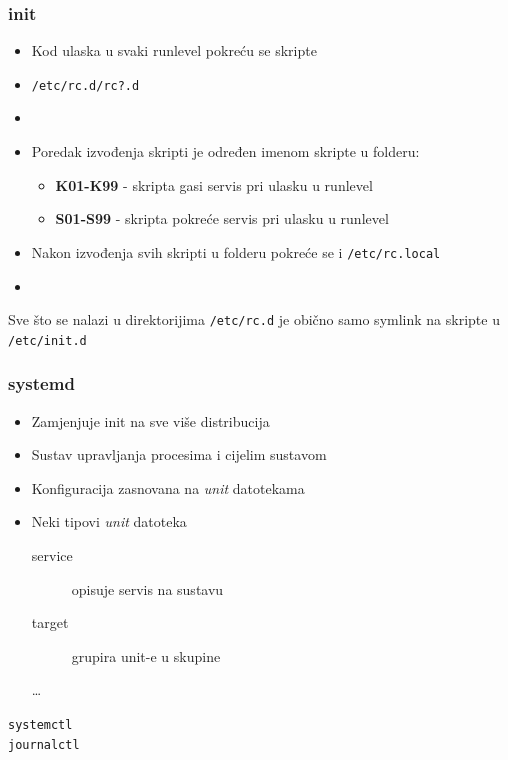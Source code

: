 \documentclass[t]{beamer}
\begin{document}
\begin{frame}
	\frametitle{init}
	\begin{itemize}
		\item Kod ulaska u svaki runlevel pokreću se skripte
		\item[] \texttt{/etc/rc.d/rc?.d}
		\item[]
		\item Poredak izvođenja skripti je određen imenom skripte u folderu:
		\begin{itemize}
			\item[] \textbf{K01-K99} - skripta gasi servis pri ulasku u runlevel
			\item[] \textbf{S01-S99} - skripta pokreće servis pri ulasku u runlevel
		\end{itemize}
		\item Nakon izvođenja svih skripti u folderu pokreće se i \texttt{/etc/rc.local}
		\item[]
	\end{itemize}
	Sve što se nalazi u direktorijima \texttt{/etc/rc.d} je obično samo symlink na skripte u \texttt{/etc/init.d}
\end{frame}

\begin{frame}
	\frametitle{systemd}
	\begin{itemize}
		\item Zamjenjuje init na sve više distribucija
		\item Sustav upravljanja procesima i cijelim sustavom
	\end{itemize}
	\begin{itemize}
		\item Konfiguracija zasnovana na \emph{unit} datotekama
		\item Neki tipovi \emph{unit} datoteka
		\begin{description}
			\item[service] opisuje servis na sustavu
			\item[target] grupira unit-e u skupine
			\item[\dots]
		\end{description}
	\end{itemize}
	\vfill
	\texttt{systemctl} \\ \texttt{journalctl}
\end{frame}
\end{document}
